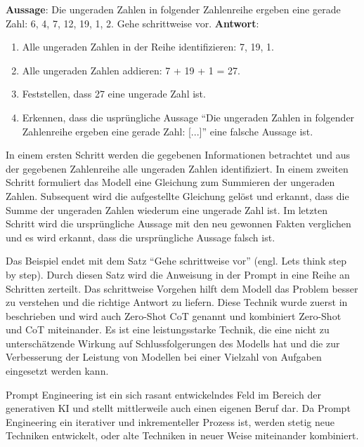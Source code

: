 \begin{tcolorbox}[colback=white]
    \textbf{Aussage}: Die ungeraden Zahlen in folgender Zahlenreihe ergeben eine gerade Zahl: 6, 4, 7, 12, 19, 1, 2.
    Gehe schrittweise vor.
    \tcbline
    \textbf{Antwort}:
    \begin{enumerate}
        \item Alle ungeraden Zahlen in der Reihe identifizieren: 7, 19, 1.
        \item Alle ungeraden Zahlen addieren: 7 + 19 + 1 = 27.
        \item Feststellen, dass 27 eine ungerade Zahl ist.
        \item Erkennen, dass die usprüngliche Aussage \enquote{Die ungeraden Zahlen in folgender Zahlenreihe ergeben eine gerade Zahl: [...]} eine falsche Aussage ist.
    \end{enumerate}
\end{tcolorbox}
In einem ersten Schritt werden die gegebenen Informationen betrachtet und aus der gegebenen Zahlenreihe alle ungeraden Zahlen identifiziert.
In einem zweiten Schritt formuliert das Modell eine Gleichung zum Summieren der ungeraden Zahlen.
Subsequent wird die aufgestellte Gleichung gelöst und erkannt, dass die Summe der ungeraden Zahlen wiederum eine ungerade Zahl ist.
Im letzten Schritt wird die ursprüngliche Aussage mit den neu gewonnen Fakten verglichen und es wird erkannt, dass die ursprüngliche Aussage falsch ist.

Das Beispiel endet mit dem Satz \enquote{Gehe schrittweise vor} (engl. Lets think step by step).
Durch diesen Satz wird die Anweisung in der Prompt in eine Reihe an Schritten zerteilt.
Das schrittweise Vorgehen hilft dem Modell das Problem besser zu verstehen und die richtige Antwort zu liefern.
Diese Technik wurde zuerst in \cite{zero-shot-reasoners} beschrieben und wird auch Zero-Shot CoT genannt und kombiniert Zero-Shot und CoT miteinander.
Es ist eine leistungsstarke Technik, die eine nicht zu unterschätzende Wirkung auf Schlussfolgerungen des Modells hat und die zur Verbesserung der Leistung von Modellen bei einer Vielzahl von Aufgaben eingesetzt werden kann.

Prompt Engineering ist ein sich rasant entwickelndes Feld im Bereich der generativen KI und stellt mittlerweile auch einen eigenen Beruf dar.
Da Prompt Engineering ein iterativer und inkrementeller Prozess ist, werden stetig neue Techniken entwickelt, oder alte Techniken in neuer Weise miteinander kombiniert.

